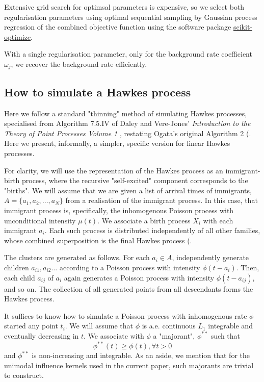 \documentclass[11pt]{article}
\begin{document}
    Extensive grid search for optimsal parameters is expensive, so we select
both regularisation parameters using optimal sequential sampling by
Gaussian process regression of the combined objective function
\cite{snoek_practical_2012} using the software package
\href{https://github.com/scikit-optimize/scikit-optimize}{scikit-optimize}.


    With a single regularisation parameter, only for the background rate
coefficient \(\omega_j\), we recover the background rate efficiently.


    \subsection{How to simulate a Hawkes
process}\label{how-to-simulate-a-hawkes-process}

Here we follow a standard "thinning" method of simulating Hawkes
processes, specialised from Algorithm 7.5.IV of Daley and Vere-Jones'
\emph{Introduction to the Theory of Point Processes Volume 1}
\cite{daley_introduction_2003}, restating Ogata's original Algorithm 2
(\cite{ogata_lewis_1981}. Here we present, informally, a simpler,
specific version for linear Hawkes processes.

For clarity, we will use the representation of the Hawkes process as an
immigrant-birth process, where the recursive "self-excited" component
corresponds to the "births". We will assume that we are given a list of
arrival times of immigrants, \(A=\{a_1,a_2,\dots,a_N\}\) from a
realisation of the immigrant process. In this case, that immigrant
process is, specifically, the inhomogenous Poisson process with
unconditional intensity \(\mu(t)\). We associate a birth process \(X_i\)
with each immigrant \(a_i\). Each such process is distributed
independently of all other families, whose combined superposition is the
final Hawkes process (\cite{hawkes_cluster_1974}.

The clusters are generated as follows. For each \(a_i \in A\),
independently generate children \(a_{i1},a_{i2}\dots\) according to a
Poisson process with intensity \(\phi(t-a_i)\). Then, each child
\(a_{ij}\) of \(a_i\) again generates a Poisson process with intensity
\(\phi(t − a_{ij})\), and so on. The collection of all generated points
from all descendants forms the Hawkes process.

It suffices to know how to simulate a Poisson process with inhomogenous
rate \(\phi\) started any point \(t_i\). We will assume that \(\phi\) is
a.e. continuous \(L_1\) integrable and eventually decreasing in \(t\).
We associate with \(\phi\) a "majorant", \(\phi^{**}\) such that
\[\phi^{**}(t)\geq\phi(t), \forall t>0\] and \(\phi^{**}\) is
non-increasing and integrable. As an aside, we mention that for the
unimodal influence kernels used in the current paper, such majorants are
trivial to construct.
\end{document}
